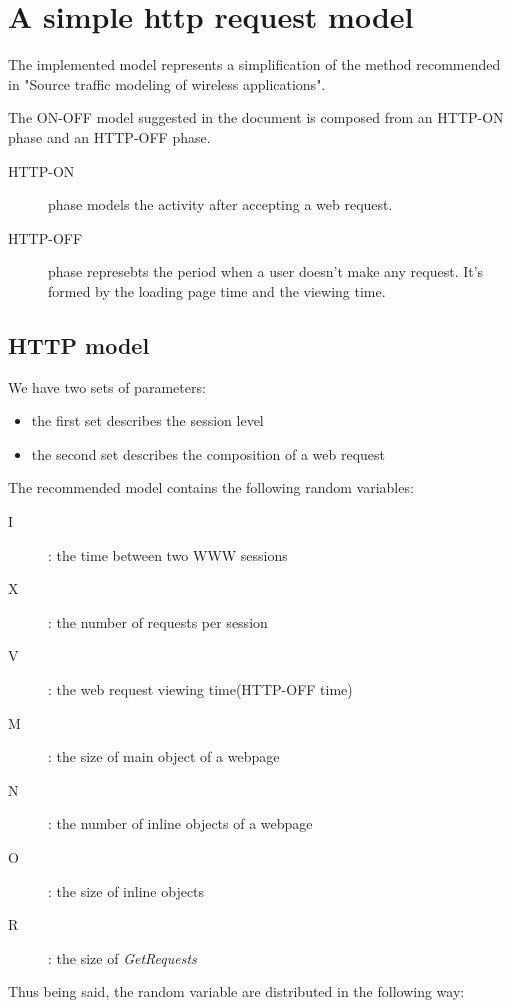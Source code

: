 %
\section{A simple http request model}

 The implemented model represents a simplification of the method recommended in "Source traffic modeling of wireless applications".

The ON-OFF model suggested in the document is composed from an HTTP-ON phase and an HTTP-OFF phase.
\begin{description}
 \item[HTTP-ON] phase models the activity after accepting a web request.
 \item[HTTP-OFF] phase represebts the period when a user doesn't make any request. It's formed by the loading page time and the viewing time.
\end{description}

\subsection{HTTP model}

We have two sets of parameters:
\begin{itemize}
 \item the first set describes the session level
 \item the second set describes the composition of a web request
\end{itemize}

The recommended model contains the following random variables:

\begin{description}
 \item[I]: the time between two WWW sessions
 \item[X]: the number of requests per session
 \item[V]: the web request viewing time(HTTP-OFF time)
 \item[M]: the size of main object of a webpage
 \item[N]: the number of inline objects of a webpage
 \item[O]: the size of inline objects
 \item[R]: the size of \textit{GetRequests}

\end{description}
Thus being said, the random variable are distributed in the following way:

